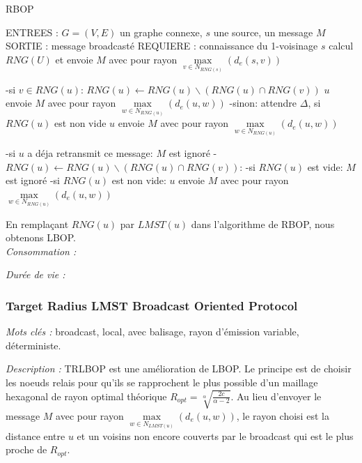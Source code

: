 \begin{algorithm}[H]
\caption{RBOP}
\label{algo_RBOP}
\begin{algorithmic}
\STATE ENTREES : $G=(V,E)$ un graphe connexe, $s$ une source, un message $M$
\STATE SORTIE : message broadcasté
\STATE REQUIERE : connaissance du 1-voisinage
\STATE $s$ calcul $RNG(U)$ et envoie $M$ avec pour rayon $\max\limits_{v\in N_{RNG(s)}}(d_e(s,v))$

		\STATE -si $v\in RNG(u)$: $RNG(u)\leftarrow RNG(u)\backslash(RNG(u)\cap RNG(v))$ $u$ envoie $M$ avec pour rayon $\max\limits_{w\in N_{RNG(u)}}(d_e(u,w))$
		\STATE -sinon: attendre $\Delta$, si $RNG(u)$ est non vide  $u$ envoie $M$ avec pour rayon $\max\limits_{w\in N_{RNG(u)}}(d_e(u,w))$
			 	
	\ENDIF
		\STATE -si $u$ a déja retransmit ce message: $M$ est ignoré
		\STATE -$RNG(u)\leftarrow RNG(u)\backslash(RNG(u)\cap RNG(v))$:
		\INDSTATE   -si $RNG(u)$ est vide: $M$ est ignoré
		\INDSTATE   -si $RNG(u)$ est non vide: $u$ envoie $M$ avec pour rayon $\max\limits_{w\in N_{RNG(u)}}(d_e(u,w))$
			 	
	\ENDIF

\ENDIF
\end{algorithmic}
\end{algorithm}

En remplaçant $RNG(u)$ par $LMST(u)$ dans l'algorithme de RBOP, nous obtenons LBOP.\\

\emph{Consommation :}

\emph{Durée de vie :} 


\subsubsection{Target Radius LMST Broadcast Oriented Protocol \cite{Ingelrest2004}}
\emph{Mots clés :} broadcast, local, avec balisage, rayon d'émission variable, déterministe.

\emph{Description :} TRLBOP est une amélioration de LBOP. Le principe est de choisir les noeuds relais pour qu'ils se rapprochent le plus possible d'un maillage hexagonal de rayon optimal théorique $R_{opt}=\sqrt[\alpha]{\frac{2c}{\alpha-2}}$. Au lieu d'envoyer le message $M$ avec pour rayon $\max\limits_{w\in N_{LMST(u)}}(d_e(u,w))$, le rayon choisi est la distance entre $u$ et un voisins non encore couverts par le broadcast qui est le plus proche de $R_{opt}$.

